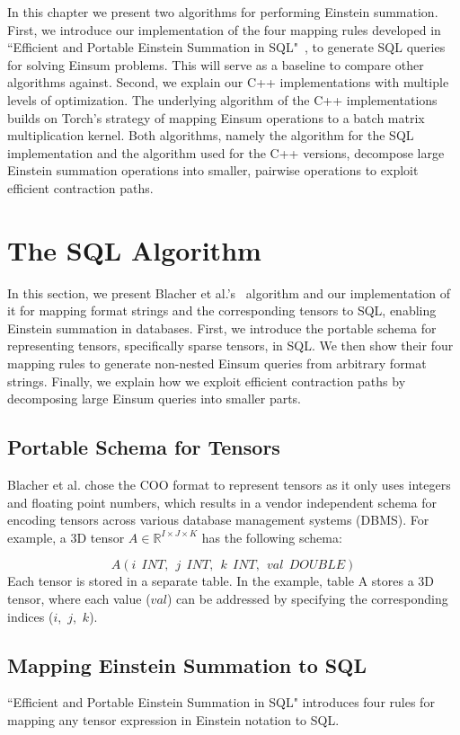 In this chapter we present two algorithms for performing Einstein summation. First,
we introduce our implementation of the four mapping rules developed in ``Efficient and Portable
Einstein Summation in SQL"~\cite{sql_einsum}, to generate SQL queries for solving Einsum problems.
This will serve as a baseline to compare other algorithms against. Second, we explain our C++
implementations with multiple levels of optimization. The underlying algorithm of the C++
implementations builds on Torch's strategy of mapping Einsum operations to a batch matrix
multiplication kernel. Both algorithms, namely the algorithm for the SQL implementation and
the algorithm used for the C++ versions, decompose large Einstein summation operations
into smaller, pairwise operations to exploit efficient contraction paths.

\section{The SQL Algorithm}
In this section, we present Blacher et al.'s~\cite{sql_einsum} algorithm and our
implementation of it for mapping format strings and the corresponding tensors to SQL,
enabling Einstein summation in databases. First, we introduce the portable schema for
representing tensors, specifically sparse tensors, in SQL. We then show their four mapping
rules to generate non-nested Einsum queries from arbitrary format strings. Finally, we
explain how we exploit efficient contraction paths by decomposing large Einsum queries
into smaller parts.

\subsection{Portable Schema for Tensors}
Blacher et al. chose the COO format to represent tensors as it only uses integers and
floating point numbers, which results in a vendor independent schema for encoding tensors
across various database management systems (DBMS). For example, a 3D tensor $A \in
    \mathbb{R}^{I \times J \times K}$ has the following schema:

\[
    A(i\ \ INT,\ \ j\ \ INT,\ \ k\ \ INT,\ \ val\ \ DOUBLE)
\]
%
Each tensor is stored in a separate table. In the example, table A stores a 3D tensor,
where each value ($val$) can be addressed by specifying the corresponding indices
($i$,~$j$,~$k$).

\subsection{Mapping Einstein Summation to SQL}
``Efficient and Portable Einstein Summation in SQL" introduces four rules for mapping
any tensor expression in Einstein notation to SQL.

